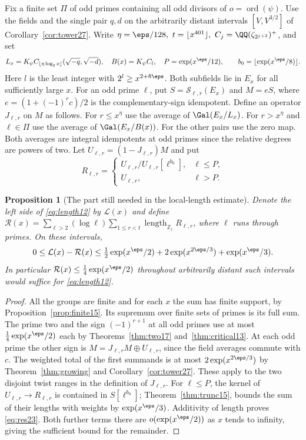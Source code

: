 \documentclass[a4paper,11pt]{article}
\newtheorem{proposition}{Proposition}[section]
\theoremstyle{definition}
\theoremstyle{remark}
\newcommand{\lead}[1]{\par\smallskip\noindent{\bfseries\color{ink}#1.}\enspace}
\newcommand{\ZZ}{\mathbb Z}\newcommand{\ord}{\operatorname{ord}}
\newcommand{\len}{\operatorname{length}}\newcommand{\Res}{\operatorname*{Res}}
\numberwithin{equation}{section}
\begin{document}
\lead{The residual local groups}Fix a finite set \(\Pi\) of odd primes containing all odd divisors of \(o=\operatorname{ord}(\psi)\). Use the fields and the single pair \(q,d\) on the arbitrarily distant intervals \([V,V^{3/2}]\) of Corollary~\ref{cor:tower27}. Write \(\eta=\eps/128,\ t=\lfloor x^{401}\rfloor,\ C_j=\QQ(\zeta_{2^{j+2}})^+\), and set
\[
 L_x=K_\psi C_{\lfloor\eta\log_2 x\rfloor}(\sqrt{-q},\sqrt{-d}),\quad
 B(x)=K_\psi C_l,\quad
 P=\exp(x^\eps/12),\qquad b_0=\lfloor\exp(x^\eps/8)\rfloor.
\]
Here \(l\) is the least integer with \(2^l\ge x^{2+8\eps}\). Both subfields lie in \(E_x\) for all sufficiently large \(x\). For an odd prime \(\ell\), put \(S=\mathcal S_{\ell,r}(E_x)\) and \(M=eS\), where \(e=(1+(-1)^rc)/2\) is the complementary-sign idempotent. Define an operator \(J_{\ell,r}\) on \(M\) as follows. For \(r\le x^\eta\) use the average of \(\Gal(E_x/L_x)\). For \(r>x^\eta\) and \(\ell\in\Pi\) use the average of \(\Gal(E_x/B(x))\). For the other pairs use the zero map. Both averages are integral idempotents at odd primes since the relative degrees are powers of two. Let \(U_{\ell,r}=(1-J_{\ell,r})M\) and put
\[
 R_{\ell,r}=
 \begin{cases}
 U_{\ell,r}/U_{\ell,r}[\ell^{b_0}],& \ell\le P,\\
 U_{\ell,r},&\ell>P .
 \end{cases}
\]

\begin{proposition}[The part still needed in the local-length estimate]\label{prop:res23}
Denote the left side of \eqref{eq:length12} by \(\mathcal L(x)\) and define
\(\mathcal R(x)=\sum_{\ell>2}(\log\ell)\sum_{1\le r<t}\len_{\ZZ_\ell}R_{\ell,r}\), where \(\ell\) runs through primes. On these intervals,
\begin{equation}
 0\le\mathcal L(x)-\mathcal R(x)
 \le \tfrac12\exp(x^\eps/2)+2\exp(x^{2\eps/3})+\exp(x^\eps/3).
 \label{eq:res23}
\end{equation}
In particular \(\mathcal R(x)\le\tfrac14\exp(x^\eps/2)\) throughout arbitrarily distant such intervals would suffice for \eqref{eq:length12}.
\end{proposition}
\begin{proof}
All the groups are finite and for each \(x\) the sum has finite support, by Proposition~\ref{prop:finite15}. Its supremum over finite sets of primes is its full sum. The prime two and the sign \((-1)^{r+1}\) at all odd primes use at most \(\tfrac14\exp(x^\eps/2)\) each by Theorems~\ref{thm:two17} and~\ref{thm:critical13}. At each odd prime the other sign is \(M=J_{\ell,r}M\oplus U_{\ell,r}\), since the field averages commute with \(c\). The weighted total of the first summands is at most \(2\exp(x^{2\eps/3})\) by Theorem~\ref{thm:growing} and Corollary~\ref{cor:tower27}. These apply to the two disjoint twist ranges in the definition of \(J_{\ell,r}\). For \(\ell\le P\), the kernel of \(U_{\ell,r}\to R_{\ell,r}\) is contained in \(S[\ell^{b_0}]\); Theorem~\ref{thm:trunc15}, bounds the sum of their lengths with weights by \(\exp(x^\eps/3)\). Additivity of length proves \eqref{eq:res23}. Both further terms there are \(o(\exp(x^\eps/2))\) as \(x\) tends to infinity, giving the sufficient bound for the remainder.
\end{proof}
\end{document}
